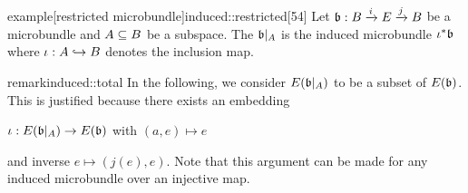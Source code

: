 \begin{mystatement}{example}[restricted microbundle]{induced::restricted}[54]   
    Let $\bundledef{\bb}{B}{E}{i}{j}$ be a microbundle and $A \subseteq{} B$ be a subspace.
    The  $\bb[A]$ is the induced microbundle $\ind{\iota}\bb$
    where $\iota: A \hookrightarrow{} B$ denotes the inclusion map.
\end{mystatement}

\begin{mystatement}{remark}{induced::total}
    In the following, we consider $E(\bb[A])$ to be a subset of $E(\bb)$.
    This is justified because there exists an embedding
    \begin{center}
        $\iota: E(\bb[A]) \to E(\bb)$ with $(a, e) \mapsto e$
    \end{center}
    and inverse $e \mapsto (j(e), e)$.
    Note that this argument can be made for any induced microbundle over an injective map.
\end{mystatement}